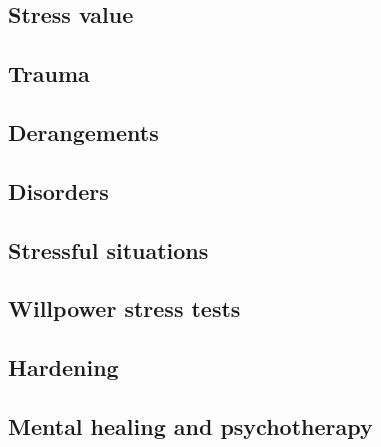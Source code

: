 \subsection{Stress value}

\subsection{Trauma}

\subsection{Derangements}

\subsection{Disorders}

\subsection{Stressful situations}

\subsection{Willpower stress tests}

\subsection{Hardening}

\subsection{Mental healing and psychotherapy}

